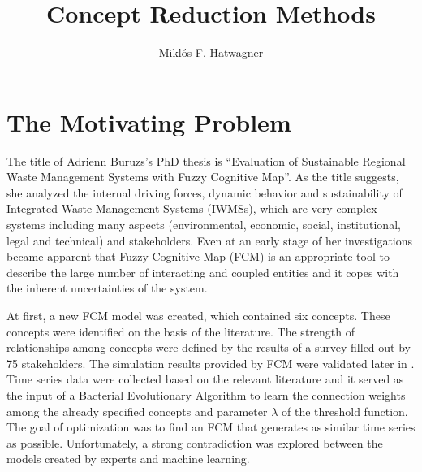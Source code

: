 \documentclass[graybox]{svmult}
\begin{document}
\title*{Concept Reduction Methods}
\author{Miklós F. Hatwagner}
%
%
\maketitle



\section{The Motivating Problem}
\label{sec:1}

The title of Adrienn Buruzs's PhD thesis \cite{buruzsphd2015} is ``Evaluation of Sustainable Regional Waste Management Systems with Fuzzy Cognitive Map''. As the title suggests, she analyzed the internal driving forces, dynamic behavior and sustainability of Integrated Waste Management Systems (IWMSs), which are very complex systems including many aspects (environmental, economic, social, institutional, legal and technical) and stakeholders. Even at an early stage of her investigations became apparent that Fuzzy Cognitive Map (FCM) is an appropriate tool to describe the large number of interacting and coupled entities and it copes with the inherent uncertainties of the system.

At first, a new FCM model \cite{buruzs2013developing} was created, which contained six concepts. These concepts were identified on the basis of the literature. The strength of relationships among concepts were defined by the results of a survey filled out by 75 stakeholders. The simulation results provided by FCM were validated later in \cite{buruzs2013advanced}. Time series data were collected based on the relevant literature and it served as the input of a Bacterial Evolutionary Algorithm to learn the connection weights among the already specified concepts and parameter $\lambda$ of the threshold function. The goal of optimization was to find an FCM that generates as similar time series as possible. Unfortunately, a strong contradiction was explored between the models created by experts and machine learning.
\end{document}
